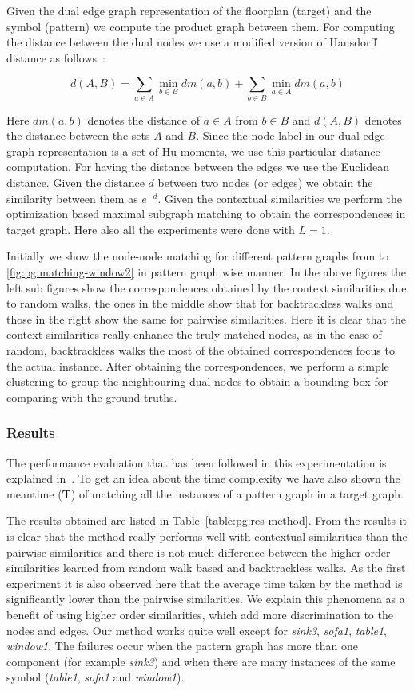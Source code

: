 Given the dual edge graph representation of the floorplan (target) and the symbol (pattern) we compute the product graph between them. For computing the distance between the dual nodes we use a modified version of Hausdorff distance as follows~\cite{Fischer2013}:

\[
d(A,B)=\sum_{a\in A} \min_{b\in B} dm(a,b) + \sum_{b\in B} \min_{a\in A} dm(a,b)
\]

Here $dm(a,b)$ denotes the distance of $a\in A$ from $b\in B$ and $d(A,B)$ denotes the distance between the sets $A$ and $B$. Since the node label in our dual edge graph representation is a set of Hu moments, we use this particular distance computation. For having the distance between the edges we use the Euclidean distance. Given the distance $d$ between two nodes (or edges) we obtain the similarity between them as $e^{-d}$. Given the contextual similarities we perform the optimization based maximal subgraph matching to obtain the correspondences in target graph. Here also all the experiments were done with $L=1$.

Initially we show the node-node matching for different pattern graphs from  to \ref{fig:pg:matching-window2} in pattern graph wise manner. In the above figures the left sub figures show the correspondences obtained by the context similarities due to random walks, the ones in the middle show that for backtrackless walks and those in the right show the same for pairwise similarities. Here it is clear that the context similarities really enhance the truly matched nodes, as in the case of random, backtrackless walks the most of the obtained correspondences focus to the actual instance. After obtaining the correspondences, we perform a simple clustering to group the neighbouring dual nodes to obtain a bounding box for comparing with the ground truths.


\subsubsection{Results}
The performance evaluation that has been followed in this experimentation is explained in~. To get an idea about the time complexity we have also shown the meantime (\textbf{T}) of matching all the instances of a pattern graph in a target graph.

The results obtained are listed in Table~\ref{table:pg:res-method}. From the results it is clear that the method really performs well with contextual similarities than the pairwise similarities and there is not much difference between the higher order similarities learned from random walk based and backtrackless walks. As the first experiment it is also observed here that the average time taken by the method is significantly lower than the pairwise similarities. We explain this phenomena as a benefit of using higher order similarities, which add more discrimination to the nodes and edges. Our method works quite well except for \emph{sink3}, \emph{sofa1}, \emph{table1}, \emph{window1}. The failures occur when the pattern graph has more than one component (for example \emph{sink3}) and when there are many instances of the same symbol (\emph{table1}, \emph{sofa1} and \emph{window1}).

